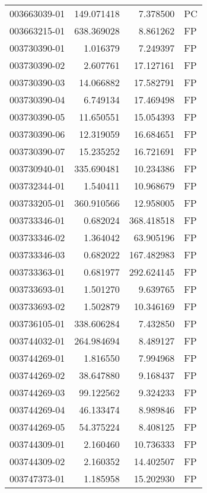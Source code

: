 \begin{tabular}{lrrl}
003663039-01 &  149.071418 &       7.378500 &   PC \\
003663215-01 &  638.369028 &       8.861262 &   FP \\
003730390-01 &    1.016379 &       7.249397 &   FP \\
003730390-02 &    2.607761 &      17.127161 &   FP \\
003730390-03 &   14.066882 &      17.582791 &   FP \\
003730390-04 &    6.749134 &      17.469498 &   FP \\
003730390-05 &   11.650551 &      15.054393 &   FP \\
003730390-06 &   12.319059 &      16.684651 &   FP \\
003730390-07 &   15.235252 &      16.721691 &   FP \\
003730940-01 &  335.690481 &      10.234386 &   FP \\
003732344-01 &    1.540411 &      10.968679 &   FP \\
003733205-01 &  360.910566 &      12.958005 &   FP \\
003733346-01 &    0.682024 &     368.418518 &   FP \\
003733346-02 &    1.364042 &      63.905196 &   FP \\
003733346-03 &    0.682022 &     167.482983 &   FP \\
003733363-01 &    0.681977 &     292.624145 &   FP \\
003733693-01 &    1.501270 &       9.639765 &   FP \\
003733693-02 &    1.502879 &      10.346169 &   FP \\
003736105-01 &  338.606284 &       7.432850 &   FP \\
003744032-01 &  264.984694 &       8.489127 &   FP \\
003744269-01 &    1.816550 &       7.994968 &   FP \\
003744269-02 &   38.647880 &       9.168437 &   FP \\
003744269-03 &   99.122562 &       9.324233 &   FP \\
003744269-04 &   46.133474 &       8.989846 &   FP \\
003744269-05 &   54.375224 &       8.408125 &   FP \\
003744309-01 &    2.160460 &      10.736333 &   FP \\
003744309-02 &    2.160352 &      14.402507 &   FP \\
003747373-01 &    1.185958 &      15.202930 &   FP \\

\end{tabular}
